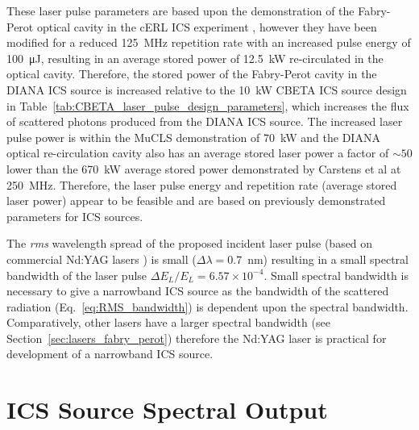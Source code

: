 \documentclass[../main.tex]{subfiles}
\begin{document}
These laser pulse parameters are based upon the demonstration of the Fabry-Perot optical cavity in the cERL ICS experiment \cite{akagi2016narrow}, however they have been modified for a reduced 125~\si{\mega\hertz} repetition rate with an increased pulse energy of 100~\si{\micro\joule}, resulting in an average stored power of 12.5~\si{\kilo\watt} re-circulated in the optical cavity. Therefore, the stored power of the Fabry-Perot cavity in the DIANA ICS source is increased relative to the 10~\si{\kilo\watt} CBETA ICS source design in Table~\ref{tab:CBETA_laser_pulse_design_parameters}, which increases the flux of scattered photons produced from the DIANA ICS source. The increased laser pulse power is within the MuCLS demonstration of 70~\si{\kilo\watt} \cite{eggl2016munich} and the DIANA optical re-circulation cavity also has an average stored laser power a factor of $\sim50$ lower than the 670~\si{\kilo\watt} average stored power demonstrated by Carstens et al \cite{carstens2014megawatt} at 250~\si{\mega\hertz}. Therefore, the laser pulse energy and repetition rate (average stored laser power) appear to be feasible and are based on previously demonstrated parameters for ICS sources. 

The \textit{rms} wavelength spread of the proposed incident laser pulse (based on commercial Nd:YAG lasers \cite{thorlabs2021ndyag200}) is small ($\Delta\lambda = 0.7$~\si{\nano\meter}) \cite{corner2019} resulting in a small spectral bandwidth of the laser pulse $\Delta E_{L}/E_{L} = 6.57\times 10^{-4}$. Small spectral bandwidth is necessary to give a narrowband ICS source as the bandwidth of the scattered radiation (Eq.~\ref{eq:RMS_bandwidth}) is dependent upon the spectral bandwidth. Comparatively, other lasers have a larger spectral bandwidth (see Section~\ref{sec:lasers_fabry_perot}) therefore the Nd:YAG laser is practical for development of a narrowband ICS source. 

\section{ICS Source Spectral Output}
\label{sec:DIANA_spectral_output}
\end{document}
